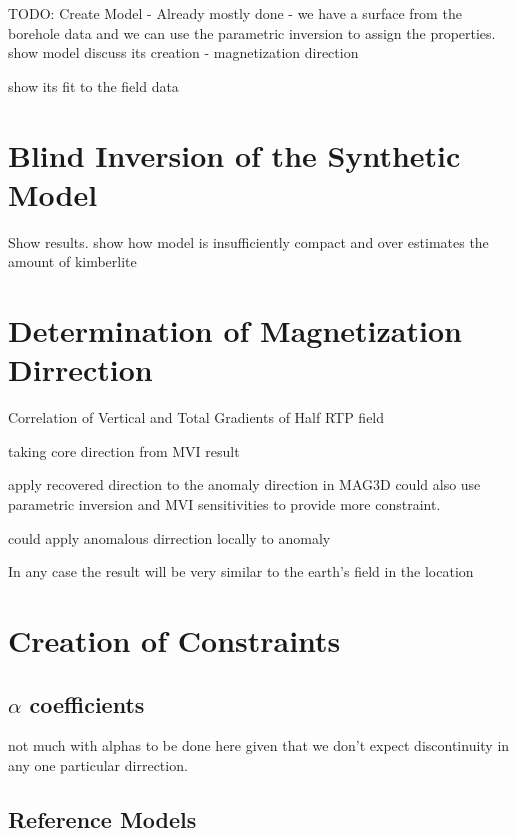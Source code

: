 TODO: Create Model
- Already mostly done
- we have a surface from the borehole data and we can use the parametric inversion to assign the properties.
show model
discuss its creation
- magnetization direction

show its fit to the field data

\section{Blind Inversion of the Synthetic Model}
\label{sec:Blind Inversion of the Synthetic Model:TKC}

Show results. show how model is insufficiently compact and over estimates the amount of kimberlite

\section{Determination of Magnetization Dirrection}
\label{sec:Determination of Magnetization Dirrection}

Correlation of Vertical and Total Gradients of Half RTP field \cite{dannemiller2006MagDirection}

taking core direction from MVI result 

apply recovered direction to the anomaly direction in MAG3D
could also use parametric inversion and MVI sensitivities to provide more constraint.

could apply anomalous dirrection locally to anomaly 

In any case the result will be very similar to the earth's field in the location

\section{Creation of Constraints}
\label{sec:Creation of Constraints:TKC}

\subsection{$\alpha$ coefficients}
\label{sec:alpha coefficients:TKC}

not much with alphas to be done here given that we don't expect discontinuity in any one particular dirrection.

\subsection{Reference Models}
\label{sec:Reference Models:TKC}

